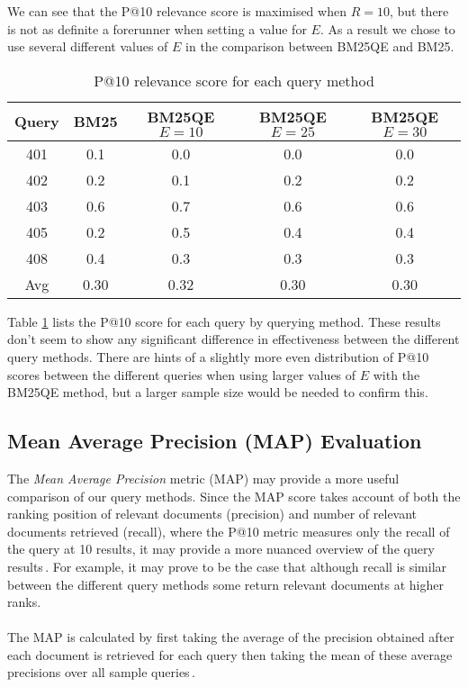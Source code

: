 We can see that the P@10 relevance score is maximised when $R=10$, but there is not as definite a forerunner when setting a value for $E$. As a result we chose to use several different values of $E$ in the comparison between BM25QE and BM25.

\begin{table}
\begin{center}
\begin{tabular}{ c | c c c c }
	\textbf{Query} & BM25 & BM25QE $E=10$&BM25QE $E=25$&BM25QE $E=30$\\
	\hline
	401 & 0.1  & 0.0  & 0.0  & 0.0 \\
	402 & 0.2  & 0.1  & 0.2  & 0.2 \\
	403 & 0.6  & 0.7  & 0.6  & 0.6 \\
	405 & 0.2  & 0.5  & 0.4  & 0.4 \\
	408 & 0.4  & 0.3  & 0.3  & 0.3 \\
	\hline
	Avg & 0.30 & 0.32 & 0.30 & 0.30 \\
\end{tabular}
\end{center}
\caption {P@10 relevance score for each query method}\label{table:Pat10result}
\end{table}
\newpage
Table \ref{table:Pat10result} lists the P@10 score for each query by querying method. These results don't seem to show any significant difference in effectiveness between the different query methods. There are hints of a slightly more even distribution of P@10 scores between the different queries when using larger values of $E$ with the BM25QE method, but a larger sample size would be needed to confirm this.

\newpage
\subsection{Mean Average Precision (MAP) Evaluation}
The \textit{Mean Average Precision} metric (MAP) may provide a more useful comparison of our query methods. Since the MAP score takes account of both the ranking position of relevant documents (precision) and number of relevant documents retrieved (recall), where the P@10 metric measures only the recall of the query at 10 results, it may provide a more nuanced overview of the query results\,\cite[pp. 159-162]{manning2008introduction}. For example, it may prove to be the case that although recall is similar between the different query methods some return relevant documents at higher ranks.

\paragraph*{}
The MAP is calculated by first taking the average of the precision obtained after each document is retrieved for each query then taking the mean of these average precisions over all sample queries\,\cite[pp. 13-14]{scholer13eval}.

